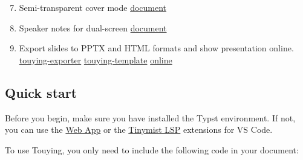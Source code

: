 
\begin{enumerate}
\setcounter{enumi}{6}
\tightlist
\item
  Semi-transparent cover mode
  \href{https://touying-typ.github.io/docs/dynamic/cover}{document}
\end{enumerate}


\begin{enumerate}
\setcounter{enumi}{7}
\tightlist
\item
  Speaker notes for dual-screen
  \href{https://touying-typ.github.io/docs/external/pympress}{document}
\end{enumerate}


\begin{enumerate}
\setcounter{enumi}{8}
\tightlist
\item
  Export slides to PPTX and HTML formats and show presentation online.
  \href{https://github.com/touying-typ/touying-exporter}{touying-exporter}
  \href{https://github.com/touying-typ/touying-template}{touying-template}
  \href{https://touying-typ.github.io/touying-template/}{online}
\end{enumerate}


\subsection{Quick start}\label{quick-start}

Before you begin, make sure you have installed the Typst environment. If
not, you can use the \href{https://typst.app/}{Web App} or the
\href{https://marketplace.visualstudio.com/items?itemName=myriad-dreamin.tinymist}{Tinymist
LSP} extensions for VS Code.

To use Touying, you only need to include the following code in your
document:

\begin{Shaded}
\begin{Highlighting}[]






\end{Highlighting}
\end{Shaded}

